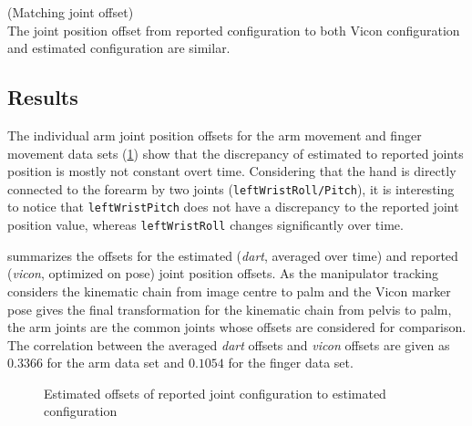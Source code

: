 \begin{hypothesis}(Matching joint offset)\\
The joint position offset from reported configuration to both Vicon configuration and estimated configuration are similar.
\label{hyp:matching_joint_offset}
\end{hypothesis}

\subsection{Results}

The individual arm joint position offsets for the arm movement and finger movement data sets (\cref{fig:estimated_offsets}) show that the discrepancy of estimated to reported joints position is mostly not constant overt time. Considering that the hand is directly connected to the forearm by two joints (\texttt{leftWristRoll/Pitch}), it is interesting to notice that \texttt{leftWristPitch} does not have a discrepancy to the reported joint position value, whereas \texttt{leftWristRoll} changes significantly over time.

 summarizes the offsets for the estimated (\textit{dart}, averaged over time) and reported (\textit{vicon}, optimized on pose) joint position offsets. As the manipulator tracking considers the kinematic chain from image centre to palm and the Vicon marker pose gives the final transformation for the kinematic chain from pelvis to palm, the arm joints are the common joints whose offsets are considered for comparison.
The correlation between the averaged \textit{dart} offsets and \textit{vicon} offsets are given as $0.3366$ for the arm data set and $0.1054$ for the finger data set.

\begin{figure}
\centering
{}

\caption[Estimated offsets]{Estimated offsets of reported joint configuration to estimated configuration}
\label{fig:estimated_offsets}
\end{figure}


